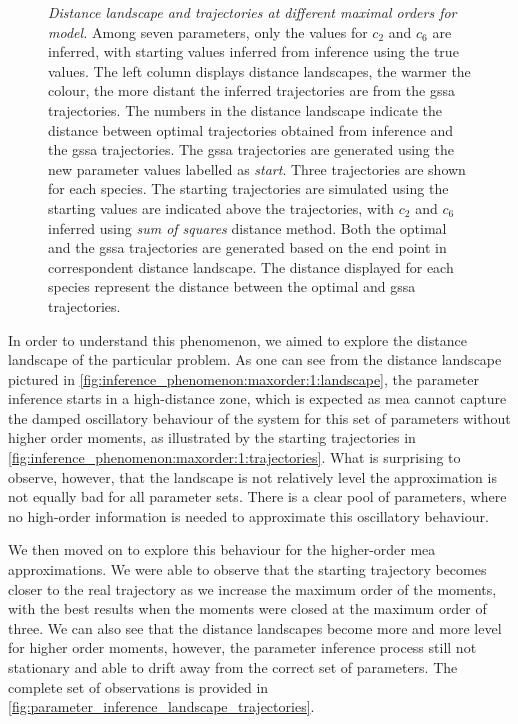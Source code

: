 \begin{figure}
\caption{\emph{Distance landscape and trajectories at different maximal orders for \pft{} model.}  Among seven parameters, only the values for $c_2$ and $c_6$ are inferred, with starting values inferred from inference using the true values.
The left column displays distance landscapes, the warmer the colour, the more distant the inferred trajectories are from the \gls{gssa} trajectories.
The numbers in the distance landscape indicate the distance between optimal trajectories obtained from inference and the \gls{gssa} trajectories.
The \gls{gssa} trajectories are generated using the new parameter values labelled as \emph{start}.
Three trajectories are shown for each species.
The starting trajectories are simulated using the starting values are indicated above the trajectories, with $c_2$ and $c_6$ inferred using \emph{sum of squares} distance method.
Both the optimal and the \gls{gssa} trajectories are generated based on the end point in correspondent distance landscape.
The distance displayed for each species represent the distance between the optimal and \gls{gssa} trajectories.}
\label{fig:parameter_inference_landscape_trajectories}
\end{figure}


In order to understand this phenomenon, we aimed to explore the distance landscape of the particular problem. As one can see from the distance landscape pictured in \autoref{fig:inference_phenomenon:maxorder:1:landscape}, the parameter inference starts in a high-distance zone, which is expected as \gls{mea} cannot capture the damped oscillatory behaviour of the system for this set of parameters without higher order moments, as illustrated by the starting trajectories in \autoref{fig:inference_phenomenon:maxorder:1:trajectories}. 
What is surprising to observe, however, that the landscape is not relatively level \ie{} the approximation is not equally bad for all parameter sets. There is a clear pool of parameters, where no high-order information is needed to approximate this oscillatory behaviour.

We then moved on to explore this behaviour for the higher-order \gls{mea} approximations. We were able to observe that the starting trajectory becomes closer to the real trajectory as we increase the maximum order of the moments, with the best results when the moments were closed at the maximum order of three. 
We can also see that the distance landscapes become more and more level for higher order moments, however, the parameter inference process still not stationary and able to  drift away from the correct set of parameters. The complete set of observations is provided in \autoref{fig:parameter_inference_landscape_trajectories}.

